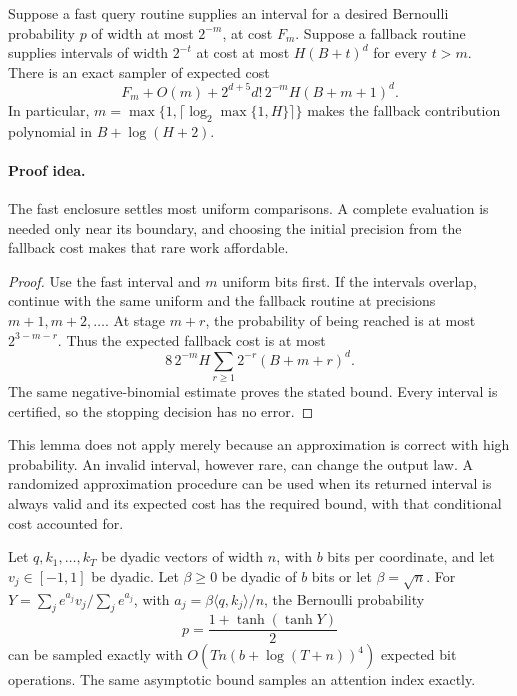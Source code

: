\begin{lemma}
\label{lem:newexactification}
Suppose a fast query routine supplies an interval for a desired
Bernoulli probability $p$ of width at most $2^{-m}$, at cost $F_m$.
Suppose a fallback routine supplies intervals of width $2^{-t}$
at cost at most $H(B+t)^d$ for every $t>m$.
There is an exact sampler of expected cost
\[
 F_m+O(m)+2^{d+5}d!\,2^{-m}H(B+m+1)^d.
\]
In particular, $m=\max\{1,\lceil\log_2\max\{1,H\}\rceil\}$ makes the
fallback contribution polynomial in $B+\log(H+2)$.
\end{lemma}
\paragraph{Proof idea.}
The fast enclosure settles most uniform comparisons.  A complete evaluation is needed only near its boundary, and choosing the initial precision from the fallback cost makes that rare work affordable.

\begin{proof}
Use the fast interval and $m$ uniform bits first. If the intervals
overlap, continue with the same uniform and the fallback routine
at precisions $m+1,m+2,\ldots$. At stage $m+r$, the probability
of being reached is at most $2^{3-m-r}$. Thus the expected fallback
cost is at most
\[
 8\,2^{-m}H\sum_{r\ge1}2^{-r}(B+m+r)^d.
\]
The same negative-binomial estimate proves the stated bound.
Every interval is certified, so the stopping decision has no error.
\end{proof}

This lemma does not apply merely because an approximation is correct
with high probability. An invalid interval, however rare, can change
the output law. A randomized approximation procedure can be used
when its returned interval is always valid and its expected cost
has the required bound, with that conditional cost accounted for.

\begin{lemma}
\label{lem:newcachescan}
Let $q,k_1,\ldots,k_T$ be dyadic vectors of width $n$, with $b$ bits
per coordinate, and let $v_j\in[-1,1]$ be dyadic. Let $\beta\ge0$
be dyadic of $b$ bits or let $\beta=\sqrt n$.
For $Y=\sum_j e^{a_j}v_j/\sum_j e^{a_j}$, with
$a_j=\beta\langle q,k_j\rangle/n$, the Bernoulli probability
\[
 p=\frac{1+\tanh(\tanh Y)}2
\]
can be sampled exactly with
$O(Tn(b+\log(T+n))^4)$ expected bit operations.
The same asymptotic bound samples an attention index exactly.
\end{lemma}
